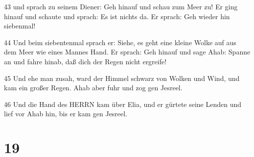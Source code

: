 \par 43 und sprach zu seinem Diener: Geh hinauf und schau zum Meer zu! Er ging hinauf und schaute und sprach: Es ist nichts da. Er sprach: Geh wieder hin siebenmal!
\par 44 Und beim siebentenmal sprach er: Siehe, es geht eine kleine Wolke auf aus dem Meer wie eines Mannes Hand. Er sprach: Geh hinauf und sage Ahab: Spanne an und fahre hinab, daß dich der Regen nicht ergreife!
\par 45 Und ehe man zusah, ward der Himmel schwarz von Wolken und Wind, und kam ein großer Regen. Ahab aber fuhr und zog gen Jesreel.
\par 46 Und die Hand des HERRN kam über Elia, und er gürtete seine Lenden und lief vor Ahab hin, bis er kam gen Jesreel.

\chapter{19}

